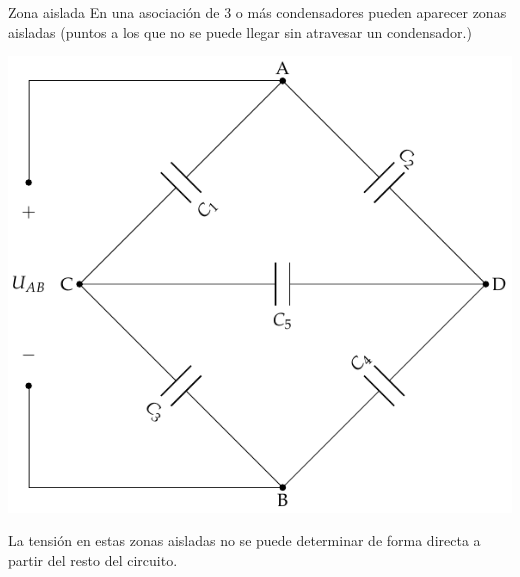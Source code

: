 \documentclass[aspectratio=169, usenames,svgnames,dvipsnames]{beamer}
\begin{document}
\begin{frame}[label={sec:org7c36cf6}]{Zona aislada}
En una asociación de 3 o más condensadores pueden aparecer zonas aisladas (puntos a los que no se puede llegar sin atravesar un condensador.)

\begin{center}
\includegraphics[height=0.6\textheight]{../figs/CondensadoresZonaAislada.pdf}
\end{center}

La tensión en estas zonas aisladas no se puede determinar de forma directa a partir del resto del circuito.
\end{frame}
\end{document}

